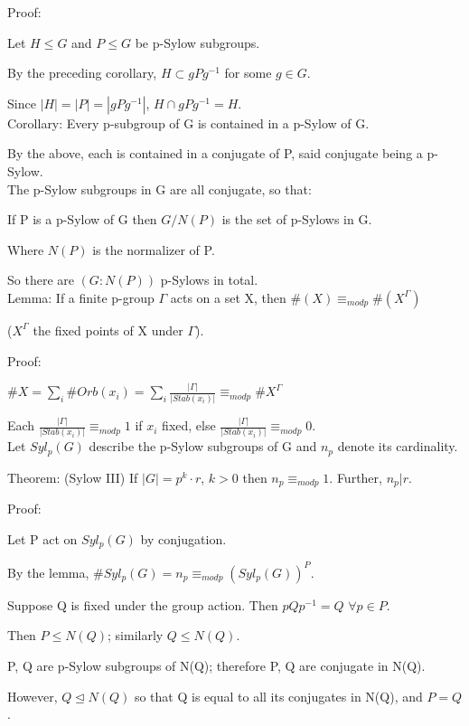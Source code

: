 \documentclass[12pt]{article}
\newcommand{\inv}{^{-1}}
\begin{document}
\noindent
Proof:

Let $H \leq G$ and $P \leq G$ be p-Sylow subgroups.

By the preceding corollary, $H \subset gPg\inv$ for some $g \in G$.

Since $|H| = |P| = |gPg^{-1}|$, $H \cap gPg\inv = H$.\\

\noindent
Corollary: Every p-subgroup of G is contained in a p-Sylow of G.

By the above, each is contained in a conjugate of P, said conjugate being a p-Sylow.\\

\noindent
The p-Sylow subgroups in G are all conjugate, so that:

If P is a p-Sylow of G then $G/N(P)$ is the set of p-Sylows in G.

Where $N(P)$ is the normalizer of P.

So there are $(G: N(P))$ p-Sylows in total.\\

\noindent
Lemma: If a finite p-group $\Gamma$ acts on a set X, then $\#(X) \equiv_{mod p} \#(X^{\Gamma})$

($X^{\Gamma}$ the fixed points of X under $\Gamma$).

\noindent
Proof:

$\#X = \sum_i \#Orb(x_i) = \sum_i \frac{|\Gamma|}{|Stab(x_i)|} \equiv_{mod p} \#X^{\Gamma}$

Each $\frac{|\Gamma|}{|Stab(x_i)|} \equiv_{mod p} 1$ if $x_i$ fixed, else $\frac{|\Gamma|}{|Stab(x_i)|} \equiv_{mod p} 0$.\\

\noindent
Let $Syl_p(G)$ describe the p-Sylow subgroups of G and $n_p$ denote its cardinality.

\noindent
Theorem: (Sylow III) If $|G|= p^k \cdot r$, $k > 0$ then $n_p \equiv_{mod p} 1$.  Further, $n_p | r$.

\noindent
Proof:

Let P act on $Syl_p(G)$ by conjugation.

By the lemma, $\#Syl_p(G) = n_p \equiv_{mod p} (Syl_p(G))^P$.

Suppose Q is fixed under the group action.  Then $pQp\inv = Q$ $\forall p \in P$.

Then $P \leq N(Q)$; similarly $Q \leq N(Q)$.

P, Q are p-Sylow subgroups of N(Q); therefore P, Q are conjugate in N(Q).

However, $Q \trianglelefteq N(Q)$ so that Q is equal to all its conjugates in N(Q), and $P = Q$.
\end{document}
